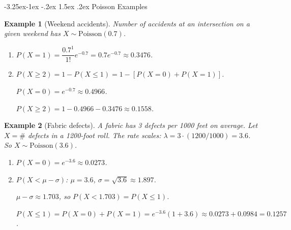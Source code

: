 \documentclass{article}
\makeatletter
\newtheorem{example}{Example}[section]
\theoremstyle{remark}
\newlength{\subsecindent}
\renewcommand\subsection{\@startsection{subsection}{2}{\subsecindent}%
  {-3.25ex\@plus -1ex \@minus -.2ex}%
  {1.5ex \@plus .2ex}%
  {\normalfont\large\bfseries}}
\newenvironment{sub}{%
  \begin{list}{}{%
    \setlength{\leftmargin}{4em}%
    \setlength{\rightmargin}{0pt}%
    \setlength{\topsep}{0pt}%
    \setlength{\partopsep}{0pt}%
    \setlength{\parsep}{\parskip}%
    \setlength{\itemsep}{\parskip}%
  }\item\relax
}{\end{list}}
\makeatother
\begin{document}
\subsection{Poisson Examples}
\begin{sub}

\begin{example}[Weekend accidents]
  \label{ex:pois-accidents}
  Number of accidents at an intersection on a given weekend has
  $X \sim \text{Poisson}(0.7)$.
  \begin{enumerate}
    \item[(a)] $P(X = 1) = \dfrac{0.7^1}{1!} e^{-0.7} = 0.7 e^{-0.7} \approx 0.3476$.
    \item[(b)] $P(X \ge 2) = 1 - P(X \le 1) = 1 - [P(X=0) + P(X=1)]$.

    $P(X=0) = e^{-0.7} \approx 0.4966$.

    $P(X \ge 2) = 1 - 0.4966 - 0.3476 \approx 0.1558$.
  \end{enumerate}
\end{example}

\begin{example}[Fabric defects]
  \label{ex:pois-fabric}
  A fabric has 3 defects per 1000 feet on average. Let $X = \#$ defects in
  a 1200-foot roll. The rate scales: $\lambda = 3 \cdot (1200/1000) = 3.6$.
  So $X \sim \text{Poisson}(3.6)$.
  \begin{enumerate}
    \item[(a)] $P(X = 0) = e^{-3.6} \approx 0.0273$.
    \item[(b)] $P(X < \mu - \sigma)$: $\mu = 3.6$, $\sigma = \sqrt{3.6} \approx 1.897$.

    $\mu - \sigma \approx 1.703$, so $P(X < 1.703) = P(X \le 1)$.

    $P(X \le 1) = P(X=0) + P(X=1) = e^{-3.6}(1 + 3.6) \approx 0.0273 + 0.0984 = 0.1257$.
  \end{enumerate}
\end{example}

\end{sub}
\end{document}
